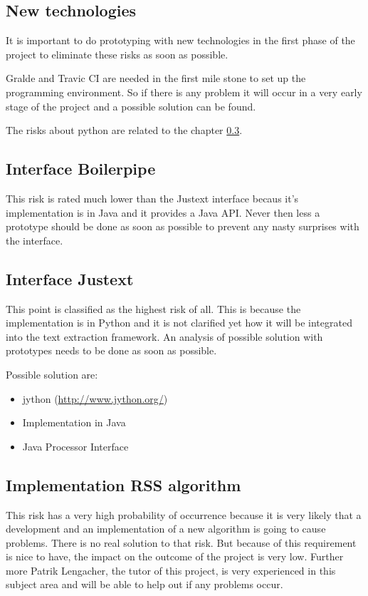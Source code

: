 \subsection{New technologies}

It is important to do prototyping with new technologies in the first phase of the project to eliminate these risks as soon as possible.

Gralde and Travic CI are needed in the first mile stone to set up the programming environment. So if there is any problem it will occur in a very early stage of the project and a possible solution can be found.

The risks about python are related to the chapter \ref{subsec:Interface Justext}.

\subsection{Interface Boilerpipe}

This risk is rated much lower than the Justext interface becaus it's implementation is in Java and it provides a Java API. Never then less a prototype should be done as soon as possible to prevent any nasty surprises with the interface.

\subsection{Interface Justext}
\label{subsec:Interface Justext}

This point is classified as the highest risk of all. This is because the implementation is in Python and it is not clarified yet how it will be integrated into the text extraction framework. An analysis of possible solution with prototypes needs to be done as soon as possible.

Possible solution are:
\begin{itemize}
\item jython (\url{http://www.jython.org/})
\item Implementation in Java
\item Java Processor Interface 
\end{itemize}


\subsection{Implementation RSS algorithm}

This risk has a very high probability of occurrence because it is very likely that a development and an implementation of a new algorithm is going to cause problems. There is no real solution to that risk. But because of this requirement is nice to have, the impact on the outcome of the project is very low. Further more Patrik Lengacher, the tutor of this project, is very experienced in this subject area and will be able to help out if any problems occur. 